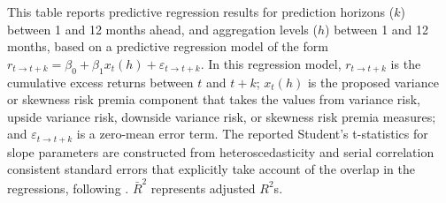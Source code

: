 \documentclass[11pt]{article}
\begin{document}
\begin{table}
\noindent\scriptsize This table reports predictive regression results for prediction horizons ($k$) between 1 and 12 months ahead, and aggregation levels ($h$) between 1 and 12 months, based on a predictive regression model of the form $r_{t\rightarrow t+k} = \beta_0 + \beta_1 x_t(h) + \varepsilon_{t\rightarrow t+k}$. In this regression model, $r_{t\rightarrow t+k}$ is the cumulative excess returns between $t$ and $t+k$; $x_t(h)$ is the proposed variance or skewness risk premia component that takes the values from variance risk, upside variance risk, downside variance risk, or skewness risk premia measures; and $\varepsilon_{t\rightarrow t+k}$ is a zero-mean error term. The reported Student's t-statistics for slope parameters are constructed from heteroscedasticity and serial correlation consistent standard errors that explicitly take account of the overlap in the regressions, following \cite{Hodrick92RFS}. $\bar{R}^2$ represents adjusted $R^2$s.

\end{table}




\clearpage
\newpage
\end{document}
